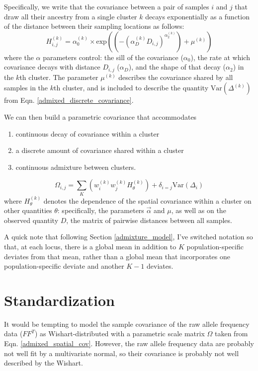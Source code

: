 \documentclass[12pt]{article}
\begin{document}
Specifically, we write that the covariance between a pair of samples $i$ and $j$
that draw all their ancestry from a single cluster $k$ decays exponentially as a function 
of the distance between their sampling locations as follows:
\begin{equation}
H^{(k)}_{i,j} = \alpha^{(k)}_0 \times \text{exp} \left( \left( -(\alpha^{(k)}_D D_{i,j})^{\alpha^{(k)}_2}\right) + \mu^{(k)}	\right)
\label{spatial_cov}
\end{equation}
where the $\alpha$ parameters control: 
the sill of the covariance ($\alpha_0$), 
the rate at which covariance decays with distance $D_{i,j}$ ($\alpha_D$),
and the shape of that decay ($\alpha_2$)
in the $k$th cluster.
The parameter $\mu^{(k)}$ describes the covariance shared by all samples in the $k$th cluster,
and is included to describe the quantity $\text{Var}(\Delta^{(k)})$ from Eqn. \eqref{admixed_discrete_covariance}.

We can then build a parametric covariance that accommodates 
\begin{enumerate}
\item continuous decay of covariance within a cluster
\item a discrete amount of covariance shared within a cluster
\item continuous admixture between clusters.
\end{enumerate}

\begin{equation}
\Omega_{i,j} = \sum\limits_K \left(	w^{(k)}_iw^{(k)}_j H^{(k)}_{\theta} 	\right) +
\delta_{i=j} \text{Var}(\Delta_i)
\label{admixed_spatial_cov}
\end{equation}
%
where $H^{(k)}_{\theta}$ denotes the dependence of the spatial covariance within a cluster 
on other quantities $\theta$: 
specifically, the parameters $\vec{\alpha}$ and $\mu$, as well as on the observed quantity $D$,
the matrix of pairwise distances between all samples.

A quick note that following Section \ref{admixture_model}, 
I've switched notation so that, at each locus, 
there is a global mean in addition to $K$ population-specific deviates from that mean,
rather than a global mean that incorporates one population-specific deviate and another $K-1$ deviates.


\section{Standardization}
It would be tempting to model the sample covariance of the raw allele frequency data ($FF^T$)
as Wishart-distributed with a parametric scale matrix $\Omega$ taken from Eqn. \eqref{admixed_spatial_cov}.
However, the raw allele frequency data are probably not well fit by a multivariate normal, 
so their covariance is probably not well described by the Wishart.
\end{document}
